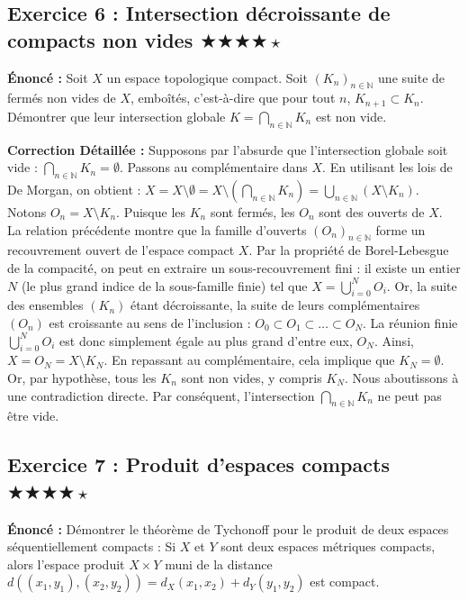 \documentclass[11pt,a4paper]{article}
\begin{document}
\subsection*{Exercice 6 : Intersection décroissante de compacts non vides \quad $\bigstar\bigstar\bigstar\bigstar\star$}

\textbf{Énoncé :} Soit $X$ un espace topologique compact. Soit $(K_n)_{n \in \mathbb{N}}$ une suite de fermés non vides de $X$, emboîtés, c'est-à-dire que pour tout $n$, $K_{n+1} \subset K_n$. Démontrer que leur intersection globale $K = \bigcap_{n \in \mathbb{N}} K_n$ est non vide.

\textbf{Correction Détaillée :}
Supposons par l'absurde que l'intersection globale soit vide : $\bigcap_{n \in \mathbb{N}} K_n = \emptyset$.
Passons au complémentaire dans $X$. En utilisant les lois de De Morgan, on obtient :
$X = X \setminus \emptyset = X \setminus \left( \bigcap_{n \in \mathbb{N}} K_n \right) = \bigcup_{n \in \mathbb{N}} (X \setminus K_n)$.
Notons $O_n = X \setminus K_n$. Puisque les $K_n$ sont fermés, les $O_n$ sont des ouverts de $X$.
La relation précédente montre que la famille d'ouverts $(O_n)_{n \in \mathbb{N}}$ forme un recouvrement ouvert de l'espace compact $X$.
Par la propriété de Borel-Lebesgue de la compacité, on peut en extraire un sous-recouvrement fini : il existe un entier $N$ (le plus grand indice de la sous-famille finie) tel que $X = \bigcup_{i=0}^N O_i$.
Or, la suite des ensembles $(K_n)$ étant décroissante, la suite de leurs complémentaires $(O_n)$ est croissante au sens de l'inclusion : $O_0 \subset O_1 \subset \dots \subset O_N$.
La réunion finie $\bigcup_{i=0}^N O_i$ est donc simplement égale au plus grand d'entre eux, $O_N$.
Ainsi, $X = O_N = X \setminus K_N$.
En repassant au complémentaire, cela implique que $K_N = \emptyset$.
Or, par hypothèse, tous les $K_n$ sont non vides, y compris $K_N$. Nous aboutissons à une contradiction directe.
Par conséquent, l'intersection $\bigcap_{n \in \mathbb{N}} K_n$ ne peut pas être vide.

\subsection*{Exercice 7 : Produit d'espaces compacts \quad $\bigstar\bigstar\bigstar\bigstar\star$}

\textbf{Énoncé :} Démontrer le théorème de Tychonoff pour le produit de deux espaces séquentiellement compacts : Si $X$ et $Y$ sont deux espaces métriques compacts, alors l'espace produit $X \times Y$ muni de la distance $d((x_1, y_1), (x_2, y_2)) = d_X(x_1, x_2) + d_Y(y_1, y_2)$ est compact.
\end{document}
